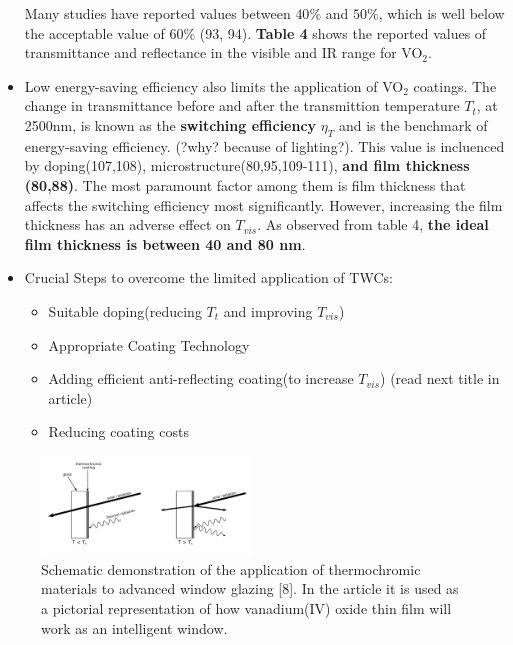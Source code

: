 \begin{itemize}
   Many studies have reported values between $40 \%$ and $50 \%$, which is well below the acceptable
   value of $60 \%$ (93, 94). \textbf{Table 4} shows the reported values of transmittance and reflectance
   in the visible and IR range for VO$_2$.
\item Low energy-saving efficiency also limits the application of VO$_2$ coatings. The
   change in transmittance before and after the transmittion temperature $T_t$, at 2500nm, is
   known as the \textbf{switching efficiency} $\eta_T$ and is the benchmark of energy-saving efficiency.
   (?why? because of lighting?). This value is incluenced by doping(107,108), microstructure(80,95,109-111),
   \textbf{and film thickness (80,88)}. The most paramount factor among them is film thickness that affects
   the switching efficiency most significantly. However, increasing the film thickness has an adverse
   effect on $T_{vis}$. As observed from table 4, \textbf{the ideal film thickness is between 40 and 80 nm}.
\item Crucial Steps to overcome the limited application of TWCs:
   \begin{itemize}
      \item Suitable doping(reducing $T_t$ and improving $T_{vis}$)
      \item Appropriate Coating Technology
      \item Adding efficient anti-reflecting coating(to increase $T_{vis}$) (read next title in article)
      \item Reducing coating costs
   \end{itemize}



      
\end{itemize}

\begin{figure}[h!]
  \centering
   \includegraphics[width=0.5\textwidth]{../Figures/TCcoating.pdf}
   \caption{Schematic demonstration of the application of thermochromic materials to advanced window glazing [8].
   In the article it is used as a pictorial representation of how vanadium(IV) oxide thin film will work as 
   an intelligent window. }
\end{figure}


